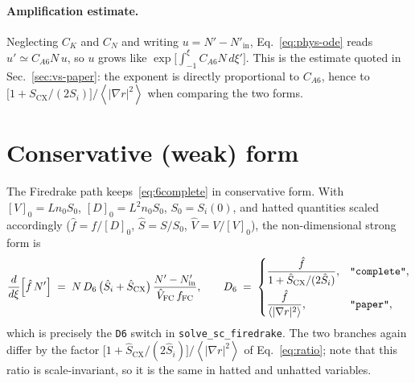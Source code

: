 \documentclass[11pt]{article}
\newcommand{\Si}{S_{i}}
\newcommand{\Scx}{S_{\mathrm{CX}}}
\newcommand{\fFC}{f_{\mathrm{FC}}}
\newcommand{\fsa}[1]{\left\langle #1 \right\rangle}
\newcommand{\gradrsq}{\fsa{|\nabla r|^{2}}}
\begin{document}
\paragraph{Amplification estimate.}  Neglecting $C_{K}$ and $C_{N}$ and
writing $u = N' - N'_{\mathrm{in}}$, Eq.~\eqref{eq:phys-ode} reads
$u' \simeq C_{A6}N\,u$, so $u$ grows like
$\exp\bigl[\int_{-1}^{\xi}C_{A6}N\,d\xi'\bigr]$.  This is the estimate quoted in
Sec.~\ref{sec:vs-paper}: the exponent is directly proportional to
$C_{A6}$, hence to $\bigl[1+\Scx/(2\Si)\bigr]/\gradrsq$ when comparing the
two forms.

\section{Conservative (weak) form}
\label{sec:weak}

The Firedrake path keeps~\eqref{eq:6complete} in conservative form.  With
$[V]_{0} = Ln_{0}S_{0}$, $[D]_{0} = L^{2}n_{0}S_{0}$, $S_{0}=\Si(0)$, and
hatted quantities scaled accordingly ($\hat f = f/[D]_{0}$,
$\hat S = S/S_{0}$, $\hat V = V/[V]_{0}$), the non-dimensional strong form
is
\begin{equation}
  \frac{d}{d\xi}\!\left[\hat f\,N'\right]
    \;=\; N\,D_{6}\,\bigl(\hat S_{i}+\hat S_{\mathrm{CX}}\bigr)\,
          \frac{N' - N'_{\mathrm{in}}}{\hat V_{\mathrm{FC}}\,\fFC},
  \qquad
  D_{6} \;=\;
  \begin{cases}
    \dfrac{\hat f}{1+\hat S_{\mathrm{CX}}/(2\hat S_{i})}, & \text{\texttt{"complete"}},\\[10pt]
    \dfrac{\hat f}{\gradrsq}, & \text{\texttt{"paper"}},
  \end{cases}
  \label{eq:strong-nd}
\end{equation}
which is precisely the \texttt{D6} switch in
\texttt{solve\_sc\_firedrake}.  The two branches again differ by the factor
$\bigl[1+\hat S_{\mathrm{CX}}/(2\hat S_{i})\bigr]/\gradrsq$ of
Eq.~\eqref{eq:ratio}; note that this ratio is scale-invariant, so it is the
same in hatted and unhatted variables.
\end{document}
